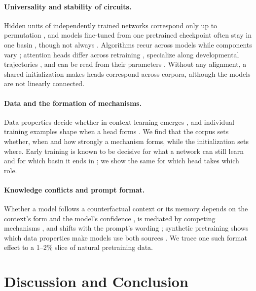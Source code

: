 \documentclass[11pt]{article}
\begin{document}
\paragraph{Universality and stability of circuits.}
Hidden units of independently trained networks correspond only up to permutation \citep{li2016convergent,entezari2022role,ainsworth2023git}, and models fine-tuned from one pretrained checkpoint often stay in one basin \citep{neyshabur2020transferred}, though not always \citep{juneja2023linear}.
Algorithms recur across models while components vary \citep{chughtai2023toy,gurnee2024universal,tigges2024llm}; attention heads differ across retraining \citep{bali2026quantifying}, specialize along developmental trajectories \citep{wang2025differentiation}, and can be read from their parameters \citep{elhelo2025maps}.
Without any alignment, a shared initialization makes heads correspond across corpora, although the models are not linearly connected.

\paragraph{Data and the formation of mechanisms.}
Data properties decide whether in-context learning emerges \citep{chan2022data,singh2024needs}, and individual training examples shape when a head forms \citep{chen2026mechanistic}.
We find that the corpus sets whether, when and how strongly a mechanism forms, while the initialization sets where.
Early training is known to be decisive for what a network can still learn \citep{achille2019critical} and for which basin it ends in \citep{frankle2020linear}; we show the same for which head takes which role.

\paragraph{Knowledge conflicts and prompt format.}
Whether a model follows a counterfactual context or its memory depends on the context's form and the model's confidence \citep{longpre2021entity,xie2024adaptive,du2024context}, is mediated by competing mechanisms \citep{ortu2024competition}, and shifts with the prompt's wording \citep{zhou2023context,sclar2024quantifying,hua2025flaw,liu2026prompt}; synthetic pretraining shows which data properties make models use both sources \citep{kim2026training}.
We trace one such format effect to a 1--2\% slice of natural pretraining data.

\section{Discussion and Conclusion}
\label{sec:conclusion}
\end{document}
